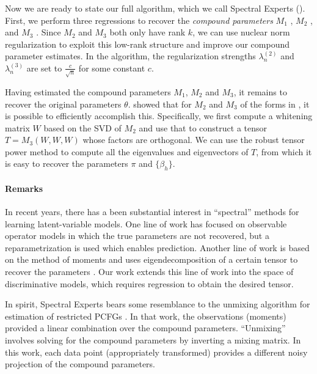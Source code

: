 Now we are ready to state our full algorithm, which we call Spectral Experts
().
First, we perform three regressions to recover the \emph{compound parameters}
$M_1$ ,
$M_2$ , and
$M_3$ .
Since $M_2$ and $M_3$ both only have rank $k$,
we can use nuclear norm regularization
\cite{Tomioka2011,NegahbanWainwright2009}
to exploit this low-rank structure and improve our compound parameter estimates.
In the algorithm, the regularization strengths $\lambda_n^{(2)}$ and $\lambda_n^{(3)}$
are set to $\frac{c}{\sqrt{n}}$ for some constant $c$.

Having estimated the compound parameters $M_1$, $M_2$ and $M_3$, it
remains to recover the original parameters $\theta$.
\citet{AnandkumarGeHsu2012} showed that for $M_2$ and $M_3$ of
the forms in , it is possible to efficiently accomplish this.
Specifically, we first compute a whitening matrix $W$ based on the SVD of $M_2$
and use that to construct a tensor $T = M_3(W, W, W)$ whose factors are orthogonal.
We can use the robust tensor power method to compute all the
eigenvalues and eigenvectors of $T$, from which it is easy to recover
the parameters $\pi$ and $\{\beta_h\}$.

\paragraph{Remarks}

In recent years, there has a been substantial interest in ``spectral'' methods
for learning latent-variable models.  One line of work has
focused on observable operator models \cite{hsu09spectral}
in which the true parameters are not recovered, but a reparametrization is used
which enables prediction.
Another line of work is based on the method of moments and uses eigendecomposition of a certain tensor
to recover the parameters \cite{anandkumar12lda,anandkumar12moments}.
Our work extends this line of work into the space of discriminative models,
which requires regression to obtain the desired tensor.

In spirit, Spectral Experts bears some resemblance to the unmixing
algorithm for estimation of restricted PCFGs
\cite{hsu12identifiability}.
In that work, the observations (moments) provided a linear combination over
the compound parameters.  ``Unmixing'' involves solving for the compound
parameters by inverting a mixing matrix.  In this work,
each data point (appropriately transformed) provides a different noisy projection of
the compound parameters.

